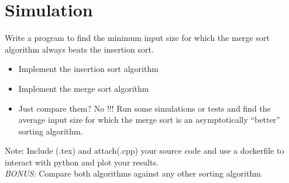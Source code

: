 \section{Simulation}

Write a program to find the minimum input size for which the merge sort algorithm always beats the insertion sort.

\begin{itemize}
    \item Implement the insertion sort algorithm
    \item Implement the merge sort algorithm
    \item Just compare them? No !!! Run some simulations or tests and find the average input size for which the merge sort is an asymptotically ``better'' sorting algorithm.
\end{itemize}

Note: Include (.tex) and attach(.cpp) your source code and use a dockerfile to interact with python and plot your results.\\

\emph{BONUS:} Compare both algorithms against any other sorting algorithm




